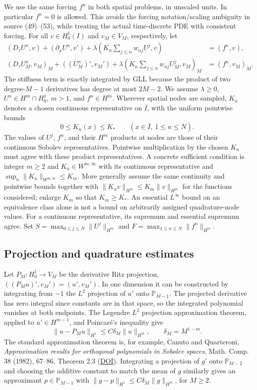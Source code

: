 \documentclass[11pt,a4paper]{amsart}
\theoremstyle{remark}
\theoremstyle{plain}
\theoremstyle{remark}
\numberwithin{equation}{section}
\begin{document}
We use the same forcing $f^n$ in both spatial problems, in unscaled units. In particular $f^n=0$ is allowed. This avoids the forcing notation/scaling ambiguity in source (49)--(53), while treating the actual time-discrete PDE with consistent forcing. For all $v\in H_0^1(I)$ and $v_M\in V_M$, respectively, let
\begin{align}
 (D_\tau U^n,v)+(\partial_x U^n,v')+\lambda(K_n\sum_{j\le n}w_{nj}U^j,v)&=(f^n,v),\label{eq:sp-cont}\\
 (D_\tau U_M^n,v_M)_M+((U_M^n)',v_M')+\lambda(K_n\sum_{j\le n}w_{nj}U_M^j,v_M)_M&=(f^n,v_M)_M.\label{eq:sp-disc}
\end{align}
The stiffness term is exactly integrated by GLL because the product of two degree-$M-1$ derivatives has degree at most $2M-2$. We assume $\lambda\ge0$, $U^n\in H^m\cap H_0^1$, $m>1$, and $f^n\in H^m$. Wherever spatial nodes are sampled, $K_n$ denotes a chosen continuous representative on $\overline I$, with the uniform pointwise bounds
\[
 0\le K_n(x)\le K_*\qquad(x\in\overline I,\ 1\le n\le N).
\]
The values of $U^j$, $f^n$, and their $H^m$ products at nodes are those of their continuous Sobolev representatives. Pointwise multiplication by the chosen $K_n$ must agree with these product representatives. A concrete sufficient condition is integer $m\ge2$ and $K_n\in W^{m,\infty}$ with its continuous representative and $\sup_n\|K_n\|_{W^{m,\infty}}\le K_m$. More generally assume the same continuity and pointwise bounds together with $\|K_n v\|_{H^m}\le K_m\|v\|_{H^m}$ for the functions considered; enlarge $K_m$ so that $K_m\ge K_*$. An essential $L^\infty$ bound on an equivalence class alone is not a bound on arbitrarily assigned quadrature-node values. For a continuous representative, its supremum and essential supremum agree. Set $S=\max_{0\le j\le N}\|U^j\|_{H^m}$ and $F=\max_{1\le n\le N}\|f^n\|_{H^m}$.

\subsection{Projection and quadrature estimates}
Let $P_M:H_0^1\to V_M$ be the derivative Ritz projection, $( (P_M u)',v_M')=(u',v_M')$. In one dimension it can be constructed by integrating from $-1$ the $L^2$ projection of $u'$ onto $\mathbb P_{M-1}$. The projected derivative has zero integral since constants are in that space, so the integrated polynomial vanishes at both endpoints. The Legendre $L^2$ projection approximation theorem, applied to $u'\in H^{m-1}$, and Poincar\'e's inequality give
\begin{equation}\label{eq:sp-proj}
 \|u-P_Mu\|_{H^1}\le C\delta_M\|u\|_{H^m},\qquad \delta_M=M^{1-m}.
\end{equation}
The standard approximation theorem is, for example, Canuto and Quarteroni, \emph{Approximation results for orthogonal polynomials in Sobolev spaces}, Math. Comp. 38 (1982), 67--86, Theorem 2.3 (\href{https://doi.org/10.1090/S0025-5718-1982-0637287-3}{DOI}). Integrating a projection of $g'$ onto $\mathbb P_{M-2}$ and choosing the additive constant to match the mean of $g$ similarly gives an approximant $p\in\mathbb P_{M-1}$ with $\|g-p\|_{H^1}\le C\delta_M\|g\|_{H^m}$, for $M\ge2$.
\end{document}

